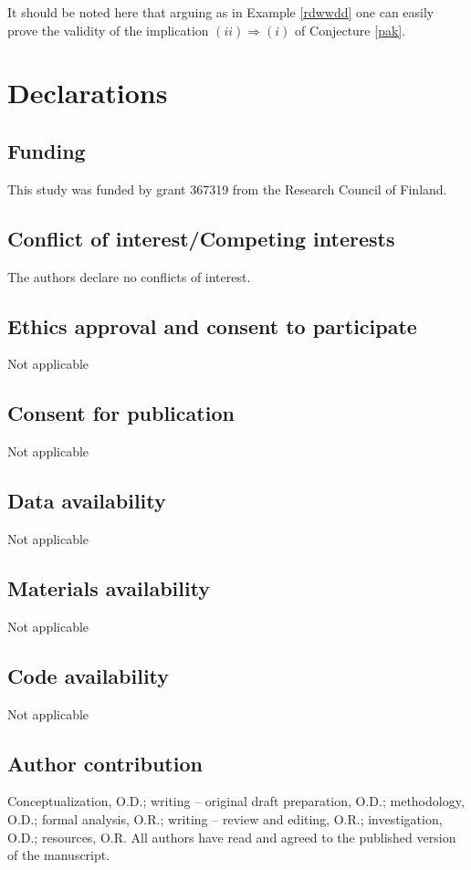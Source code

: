 \documentclass[pdflatex,sn-mathphys-num]{sn-jnl}%
\theoremstyle{thmstyleone}%
\theoremstyle{thmstyletwo}%
\theoremstyle{thmstylethree}%
\theoremstyle{thmstyletwo}%
\theoremstyle{thmstylethree}%
\begin{document}
It should be noted here that arguing as in Example \ref{rdwwdd} one can easily prove the validity of the implication $(ii) \Rightarrow (i)$ of Conjecture \ref{pak}.













\section*{Declarations}

\subsection*{Funding} This study was funded by grant 367319 from the Research Council of Finland.

\subsection*{Conflict of interest/Competing interests} The authors declare no conflicts of interest.

\subsection*{Ethics approval and consent to participate} Not applicable

\subsection*{Consent for publication} Not applicable

\subsection*{Data availability} Not applicable

\subsection*{Materials availability} Not applicable

\subsection*{Code availability} Not applicable

\subsection*{Author contribution} Conceptualization, O.D.; writing -- original draft preparation, O.D.; methodology, O.D.; formal analysis, O.R.; writing -- review and editing, O.R.; investigation, O.D.; resources, O.R. All authors have read and agreed to the published version of the manuscript.
\end{document}
